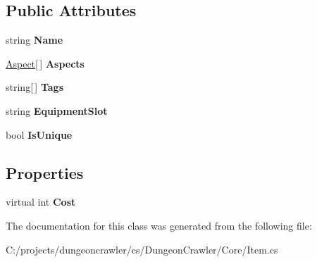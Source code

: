 \subsection*{Public Attributes}
\begin{DoxyCompactItemize}
\item 
\hypertarget{class_dungeon_crawler_1_1_core_1_1_item_ab24f9d839ae3b24d3dbbceffa8617764}{}string {\bfseries Name}\label{class_dungeon_crawler_1_1_core_1_1_item_ab24f9d839ae3b24d3dbbceffa8617764}

\item 
\hypertarget{class_dungeon_crawler_1_1_core_1_1_item_af11c39625f65ca6261e749a9d4119c61}{}\hyperlink{class_dungeon_crawler_1_1_core_1_1_aspect}{Aspect}\mbox{[}$\,$\mbox{]} {\bfseries Aspects}\label{class_dungeon_crawler_1_1_core_1_1_item_af11c39625f65ca6261e749a9d4119c61}

\item 
\hypertarget{class_dungeon_crawler_1_1_core_1_1_item_a9b5424ecb05cba5b5e96db05de4bf71e}{}string\mbox{[}$\,$\mbox{]} {\bfseries Tags}\label{class_dungeon_crawler_1_1_core_1_1_item_a9b5424ecb05cba5b5e96db05de4bf71e}

\item 
\hypertarget{class_dungeon_crawler_1_1_core_1_1_item_a6d0c7b4ba5b26317ec7b5491f0f03501}{}string {\bfseries Equipment\+Slot}\label{class_dungeon_crawler_1_1_core_1_1_item_a6d0c7b4ba5b26317ec7b5491f0f03501}

\item 
\hypertarget{class_dungeon_crawler_1_1_core_1_1_item_a966c2d2589fb77bb66aef6ecaac11923}{}bool {\bfseries Is\+Unique}\label{class_dungeon_crawler_1_1_core_1_1_item_a966c2d2589fb77bb66aef6ecaac11923}

\end{DoxyCompactItemize}
\subsection*{Properties}
\begin{DoxyCompactItemize}
\item 
\hypertarget{class_dungeon_crawler_1_1_core_1_1_item_ab7c30464136dfe49ba4f7f750cecf977}{}virtual int {\bfseries Cost}\label{class_dungeon_crawler_1_1_core_1_1_item_ab7c30464136dfe49ba4f7f750cecf977}

\end{DoxyCompactItemize}


The documentation for this class was generated from the following file\+:\begin{DoxyCompactItemize}
\item 
C\+:/projects/dungeoncrawler/cs/\+Dungeon\+Crawler/\+Core/Item.\+cs\end{DoxyCompactItemize}

